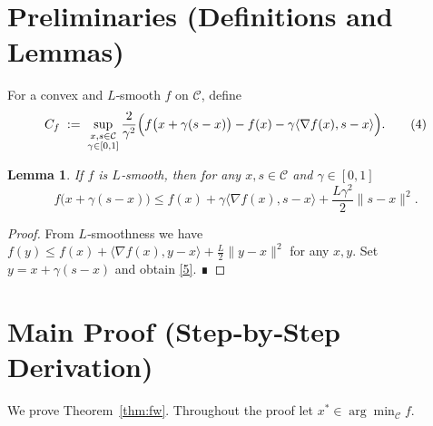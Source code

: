 \documentclass{article}
\newtheorem{lemma}{Lemma}
\begin{document}
\section*{Preliminaries (Definitions and Lemmas)}
\begin{definition}\label{def:curvature}
For a convex and $L$‑smooth $f$ on $\mathcal C$, define
\[
C_{f}\;:=\;\sup_{\substack{x,s\in\mathcal C\\ \gamma\in[0,1]}}
\frac{2}{\gamma^{2}}\Bigl(f\big(x+\gamma(s-x)\big)-f(x)-\gamma\langle\nabla f(x),s-x\rangle\Bigr).
\tag{4}
\]
\end{definition}
\begin{lemma}\label{lem:smoothness}
If $f$ is $L$‑smooth, then for any $x,s\in\mathcal C$ and $\gamma\in[0,1]$
\[
f\big(x+\gamma(s-x)\big)\le f(x)+\gamma\langle\nabla f(x),s-x\rangle
+\frac{L\gamma^{2}}{2}\|s-x\|^{2}.
\tag{5}
\]
\end{lemma}
\begin{proof}
From $L$‑smoothness we have  
$f(y)\le f(x)+\langle\nabla f(x),y-x\rangle+\frac{L}{2}\|y-x\|^{2}$ for any $x,y$.  
Set $y=x+\gamma(s-x)$ and obtain \eqref{5}. ∎
\end{proof}

\section*{Main Proof (Step‑by‑Step Derivation)}
We prove Theorem~\ref{thm:fw}. Throughout the proof let $x^{*}\in\arg\min_{\mathcal C}f$.
\end{document}
